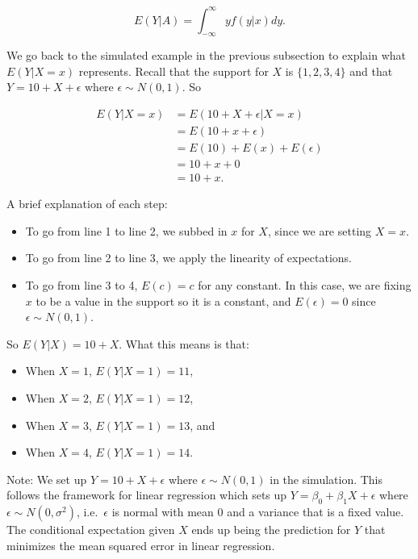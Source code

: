 \documentclass[
]{book}
\providecommand{\tightlist}{%
  \setlength{\itemsep}{0pt}\setlength{\parskip}{0pt}}
\begin{document}
\begin{equation} 
E(Y|A) = \int_{-\infty}^{\infty} y f(y|x) dy.
\label{eq:5-condexpcont2}
\end{equation}

We go back to the simulated example in the previous subsection to explain what \(E(Y|X=x)\) represents. Recall that the support for \(X\) is \(\{1,2,3,4\}\) and that \(Y = 10 + X + \epsilon\) where \(\epsilon \sim N(0,1)\). So

\[
\begin{split}
E(Y|X=x) &= E(10 + X + \epsilon | X=x)\\
 &= E(10 + x + \epsilon) \\
 &= E(10) + E(x) + E(\epsilon) \\
&= 10 + x + 0 \\
 &= 10 + x.
\end{split}
\]

A brief explanation of each step:

\begin{itemize}
\tightlist
\item
  To go from line 1 to line 2, we subbed in \(x\) for \(X\), since we are setting \(X=x\).
\item
  To go from line 2 to line 3, we apply the linearity of expectations.
\item
  To go from line 3 to 4, \(E(c)=c\) for any constant. In this case, we are fixing \(x\) to be a value in the support so it is a constant, and \(E(\epsilon) = 0\) since \(\epsilon \sim N(0,1)\).
\end{itemize}

So \(E(Y|X) = 10 + X\). What this means is that:

\begin{itemize}
\tightlist
\item
  When \(X=1\), \(E(Y|X=1) = 11\),
\item
  When \(X=2\), \(E(Y|X=1) = 12\),
\item
  When \(X=3\), \(E(Y|X=1) = 13\), and
\item
  When \(X=4\), \(E(Y|X=1) = 14\).
\end{itemize}

Note: We set up \(Y = 10 + X + \epsilon\) where \(\epsilon \sim N(0,1)\) in the simulation. This follows the framework for linear regression which sets up \(Y = \beta_0 + \beta_1 X + \epsilon\) where \(\epsilon \sim N(0,\sigma^2)\), i.e.~\(\epsilon\) is normal with mean 0 and a variance that is a fixed value. The conditional expectation given \(X\) ends up being the prediction for \(Y\) that minimizes the mean squared error in linear regression.
\end{document}
